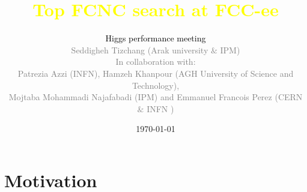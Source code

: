 \documentclass[xcolor=dvipsnames,8pt]{beamer}
\title[Top FCNC]{\LARGE\textcolor{yellow}{Top FCNC search at FCC-ee}}
\author[]{\textcolor{black}{ Higgs performance meeting} \\
	\vspace{0.5cm}
	\centering
     \textcolor{Gray}{Seddigheh Tizchang (Arak university $\&$ IPM)}\\
     \vspace{0.2cm}
               \textcolor{gray}{In collaboration with:}\\
	\textcolor{Gray}{Patrezia Azzi (INFN), Hamzeh Khanpour (AGH University of Science and Technology),\\ Mojtaba Mohammadi Najafabadi (IPM)
 and Emmanuel Francois Perez (CERN $\&$ INFN )}
}
\date{\today}
\begin{document}
\section{}
\begin{frame}
	\titlepage %
 
\end{frame}


	
	\tableofcontents %

\section{Motivation} %
\end{document}
